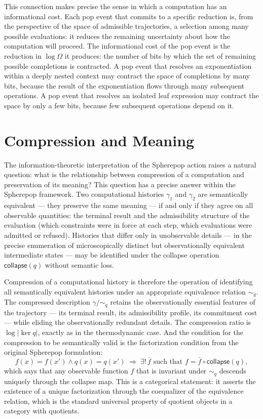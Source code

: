 \documentclass[12pt,openany]{book}
\theoremstyle{plain}
\theoremstyle{definition}
\theoremstyle{remark}
\newcommand{\scollapse}[1]{\mathsf{collapse}\!\left(#1\right)}
\begin{document}
This connection makes precise the sense in which a computation has an informational cost. Each pop event that commits to a specific reduction is, from the perspective of the space of admissible trajectories, a selection among many possible evaluations: it reduces the remaining uncertainty about how the computation will proceed. The informational cost of the pop event is the reduction in $\log \Omega$ it produces: the number of bits by which the set of remaining possible completions is contracted. A pop event that resolves an exponentiation within a deeply nested context may contract the space of completions by many bits, because the result of the exponentiation flows through many subsequent operations. A pop event that resolves an isolated leaf expression may contract the space by only a few bits, because few subsequent operations depend on it.

\section{Compression and Meaning}

The information-theoretic interpretation of the Spherepop action raises a natural question: what is the relationship between compression of a computation and preservation of its meaning? This question has a precise answer within the Spherepop framework. Two computational histories $\gamma_1$ and $\gamma_2$ are semantically equivalent — they preserve the same meaning — if and only if they agree on all observable quantities: the terminal result and the admissibility structure of the evaluation (which constraints were in force at each step, which evaluations were admitted or refused). Histories that differ only in unobservable details — in the precise enumeration of microscopically distinct but observationally equivalent intermediate states — may be identified under the collapse operation $\scollapse{q}$ without semantic loss.

Compression of a computational history is therefore the operation of identifying all semantically equivalent histories under an appropriate equivalence relation $\sim_q$. The compressed description $\gamma/{\sim_q}$ retains the observationally essential features of the trajectory — its terminal result, its admissibility profile, its commitment cost — while eliding the observationally redundant details. The compression ratio is $\log \lvert \ker q \rvert$, exactly as in the thermodynamic case. And the condition for the compression to be semantically valid is the factorization condition from the original Spherepop formulation:
\[
  f(x) = f(x') \wedge q(x) = q(x') \;\Rightarrow\; \exists!\, \bar{f} \text{ such that } f = \bar{f} \circ \scollapse{q},
\]
which says that any observable function $f$ that is invariant under $\sim_q$ descends uniquely through the collapse map. This is a categorical statement: it asserts the existence of a unique factorization through the coequalizer of the equivalence relation, which is the standard universal property of quotient objects in a category with quotients.
\end{document}
